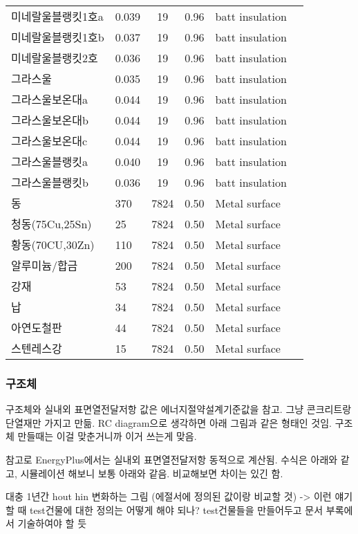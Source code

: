 \begin{longtable}{llcclc}
  미네랄울블랭킷1호a &   0.039 &   19 & 0.96 & batt insulation & \cite{ashrae_f18} \\
  미네랄울블랭킷1호b &   0.037 &   19 & 0.96 & batt insulation & \cite{ashrae_f18} \\
  미네랄울블랭킷2호 &   0.036 &   19 & 0.96 & batt insulation & \cite{ashrae_f18} \\
  그라스울 &   0.035 &   19 & 0.96 & batt insulation & \cite{ashrae_f18} \\
  그라스울보온대a &   0.044 &   19 & 0.96 & batt insulation & \cite{ashrae_f18} \\
  그라스울보온대b &   0.044 &   19 & 0.96 & batt insulation & \cite{ashrae_f18} \\
  그라스울보온대c &   0.044 &   19 & 0.96 & batt insulation & \cite{ashrae_f18} \\
  그라스울블랭킷a &   0.040 &   19 & 0.96 & batt insulation & \cite{ashrae_f18} \\
  그라스울블랭킷b &   0.036 &   19 & 0.96 & batt insulation & \cite{ashrae_f18} \\
  동 & 370 & 7824 & 0.50 & Metal surface & \cite{ashrae_f18} \\
  청동(75Cu,25Sn) &  25 & 7824 & 0.50 & Metal surface & \cite{ashrae_f18} \\
  황동(70CU,30Zn) & 110 & 7824 & 0.50 & Metal surface & \cite{ashrae_f18} \\
  알루미늄/합금 & 200 & 7824 & 0.50 & Metal surface & \cite{ashrae_f18} \\
  강재 &  53 & 7824 & 0.50 & Metal surface & \cite{ashrae_f18} \\
  납 &  34 & 7824 & 0.50 & Metal surface & \cite{ashrae_f18} \\
  아연도철판 &  44 & 7824 & 0.50 & Metal surface & \cite{ashrae_f18} \\
  스텐레스강 &  15 & 7824 & 0.50 & Metal surface & \cite{ashrae_f18} \\
  \bottomrule
\end{longtable}

\subsubsection{구조체}
구조체와 실내외 표면열전달저항 값은 에너지절약설계기준값을 참고. 그냥 콘크리트랑 단열재만 가지고 만듦. RC diagram으로 생각하면 아래 그림과 같은 형태인 것임. 구조체 만들때는 이걸 맞춘거니까 이거 쓰는게 맞음.\par
참고로 EnergyPlus에서는 실내외 표면열전달저항 동적으로 계산됨. 수식은 아래와 같고, 시뮬레이션 해보니 보통 아래와 같음. 비교해보면 차이는 있긴 함.
\begin{tcolorbox}[colback=gray!10, colframe=gray!80, boxrule=0.5pt, left=1em, right=1em]
대충 1년간 hout hin 변화하는 그림 (에절서에 정의된 값이랑 비교할 것) -> 이런 얘기할 때 test건물에 대한 정의는 어떻게 해야 되나? test건물들을 만들어두고 문서 부록에서 기술하여야 할 듯
\end{tcolorbox}

